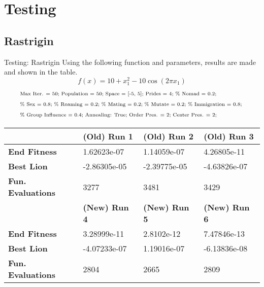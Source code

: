 \documentclass[xcolor=table]{beamer}
\begin{document}
\section{Testing}
\subsection{Rastrigin}
\begin{frame}{Testing: Rastrigin}
  Using the following function and parameters, results are made and shown in the table.
  $$
    f(x) = 10 + x_1^2 - 10 \cos(2\pi x_1)
  $$
  \begin{align*}
    &\text{\scriptsize
      Max Iter. = 50; Population = 50; Space = [-5, 5]; Prides = 4;  \% Nomad = 0.2;
    }\\
    &\text{\scriptsize
      \% Sex = 0.8; \% Roaming = 0.2; \% Mating = 0.2; \% Mutate = 0.2; \% Immigration = 0.8;
    }\\
    &\text{\scriptsize
       \% Group Influence = 0.4; Annealing: True; Order Pres. = 2; Center Pres. = 2;
    }
  \end{align*}
  \begin{table}[]
    \small
  \begin{tabular}{l|l|l|l|}
  \cline{2-4}
                                                  & \textbf{(Old) Run 1} & \textbf{(Old) Run 2} & \textbf{(Old) Run 3} \\ \hline
  \multicolumn{1}{|l|}{\textbf{End Fitness}}      & 1.62623e-07          & 1.14059e-07          & 4.26805e-11          \\ \hline
  \multicolumn{1}{|l|}{\textbf{Best Lion}}        & -2.86305e-05         & -2.39775e-05         & -4.63826e-07         \\ \hline
  \multicolumn{1}{|l|}{\textbf{Fun. Evaluations}} & 3277                 & 3481                 & 3429                 \\ \hline
                                                  & \textbf{(New) Run 4} & \textbf{(New) Run 5} & \textbf{(New) Run 6} \\ \hline
  \multicolumn{1}{|l|}{\textbf{End Fitness}}      & 3.28999e-11          & 2.8102e-12           & 7.47846e-13          \\ \hline
  \multicolumn{1}{|l|}{\textbf{Best Lion}}        & -4.07233e-07         & 1.19016e-07          & -6.13836e-08         \\ \hline
  \multicolumn{1}{|l|}{\textbf{Fun. Evaluations}} & 2804                 & 2665                 & 2809                 \\ \hline
  \end{tabular}
  \end{table}
\end{frame}
\end{document}
